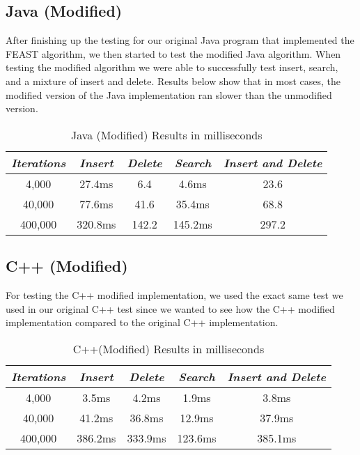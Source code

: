 \documentclass[conference]{IEEEtran}
\begin{document}
\subsection{Java (Modified)}\label{AA}
After finishing up the testing for our original Java program that implemented the FEAST algorithm, we then started to test the modified Java algorithm. When testing the modified algorithm we were able to successfully test insert, search, and a mixture of insert and delete. Results below show that in most cases, the modified version of the Java implementation ran slower than the unmodified version.

\begin{table}[htbp]
\caption{Java (Modified) Results in milliseconds}
\begin{center}
\begin{tabular}{|c|c|c|c|c|}
\hline
\cline{2-6} 
\textbf{\textit{Iterations}}& \textbf{\textit{Insert}}& \textbf{\textit{Delete}}& \textbf{\textit{Search}}& \textbf{\textit{Insert and Delete}}\\
\hline
4,000& 27.4ms& 6.4& 4.6ms& 23.6  \\
\hline
40,000& 77.6ms& 41.6& 35.4ms& 68.8 \\
\hline
400,000& 320.8ms& 142.2& 145.2ms& 297.2 \\
\hline
\end{tabular}
\label{tab1}
\end{center}
\end{table}

\subsection{C++ (Modified)}\label{AA}
For testing the C++ modified implementation, we used the exact same test we used in our original C++ test since we wanted to see how the C++ modified implementation compared to the original C++ implementation. 

\begin{table}[htbp]
\caption{C++(Modified) Results in milliseconds}
\begin{center}
\begin{tabular}{|c|c|c|c|c|}
\hline
\cline{2-6} 
\textbf{\textit{Iterations}}& \textbf{\textit{Insert}}& \textbf{\textit{Delete}}& \textbf{\textit{Search}}& \textbf{\textit{Insert and Delete}}\\
\hline
4,000& 3.5ms& 4.2ms& 1.9ms& 3.8ms  \\
\hline
40,000& 41.2ms& 36.8ms& 12.9ms& 37.9ms  \\
\hline
400,000& 386.2ms& 333.9ms& 123.6ms& 385.1ms \\
\hline
\end{tabular}
\label{tab1}
\end{center}
\end{table}
\end{document}
